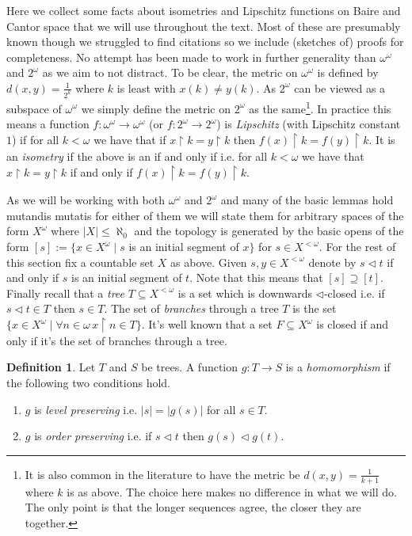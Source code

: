\documentclass[leqno,11pt]{amsart}
\theoremstyle{definition}
\newtheorem{definition}[theorem]{Definition}
\theoremstyle{remark}
\def\hook{\upharpoonright}
\def\baire{\omega^\omega}
\def\cantor{2^\omega}
\begin{document}
Here we collect some facts about isometries and Lipschitz functions on Baire and Cantor space that we will use throughout the text. Most of these are presumably known though we struggled to find citations so we include (sketches of) proofs for completeness. No attempt has been made to work in further generality than $\baire$ and $\cantor$ as we aim to not distract. To be clear, the metric on $\baire$ is defined by $d(x, y) = \frac{1}{2^k}$ where $k$ is least with $x(k) \neq y(k)$. As $\cantor$ can be viewed as a subspace of $\baire$
we simply define the metric on $\cantor$ as the same\footnote{It is also common in the literature to have the metric be $d(x, y) = \frac{1}{k+1}$ where $k$ is as above. The choice here makes no difference in what we will do. The only point is that the longer sequences agree, the closer they are together.}. In practice this means a function $f:\baire \to \baire$ (or $f:\cantor \to \cantor$) is {\em Lipschitz} (with Lipschitz constant $1$) if for all $k < \omega$ we have that if $x \hook k = y \hook k$ then $f(x) \hook k  = f(y) \hook k$. It is an {\em isometry} if the above is an if and only if i.e. for all $k < \omega$ we have that $x \hook k = y \hook k$ if and only if $f(x) \hook k = f(y) \hook k$.

As we will be working with both $\baire$ and $\cantor$ and many of the basic lemmas hold mutandis mutatis for either of them we will state them for arbitrary spaces of the form $X^\omega$ where $|X| \leq \aleph_0$ and the topology is generated by the basic opens of the form $[s] := \{x \in X^\omega \; | \; s$ is an initial segment of $x\}$ for $s \in X^{<\omega}$. For the rest of this section fix a countable set $X$ as above. Given $s, y \in X^{<\omega}$ denote by $s \lhd t$ if and only if $s$ is an initial segment of $t$. Note that this means that $[s] \supseteq [t]$. Finally recall that a {\em tree} $T \subseteq X^{< \omega}$ is a set which is downwards $\lhd$-closed i.e. if $s \lhd t \in T$ then $s \in T$. The set of {\em branches} through a tree $T$ is the set $\{x \in X^\omega \; | \; \forall n \in \omega \, x \hook n \in T\}$. It's well known that a set $F \subseteq X^\omega$ is closed if and only if it's the set of branches through a tree. 

\begin{definition}
Let $T$ and $S$ be trees. A function $g:T \to S$ is a {\em homomorphism} if the following two conditions hold.
\begin{enumerate}
\item
$g$ is {\em level preserving} i.e. $|s| = |g(s)|$ for all $s \in T$.
\item
$g$ is {\em order preserving} i.e. if $s \lhd t$ then $g(s) \lhd g(t)$.
\end{enumerate}

\end{definition}
\end{document}
